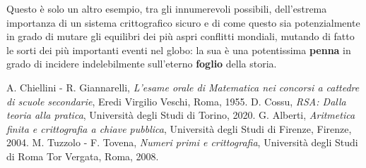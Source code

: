 \documentclass[a4paper,12pt]{article}
\begin{document}
Questo è solo un altro esempio, tra gli innumerevoli possibili, dell'estrema importanza di un sistema crittografico sicuro e di come questo sia potenzialmente in grado di mutare gli equilibri dei più aspri conflitti mondiali, mutando di fatto le sorti dei più importanti eventi nel globo: la sua è una potentissima \textbf{penna} in grado di incidere indelebilmente sull'eterno \textbf{foglio} della storia.
\begin{thebibliography}{99}
 A. Chiellini - R. Giannarelli, \emph{L'esame orale di Matematica nei concorsi a cattedre di scuole secondarie}, Eredi Virgilio Veschi, Roma, 1955.
 D. Cossu, \emph{RSA: Dalla teoria alla pratica}, Università degli Studi di Torino, 2020.
 G. Alberti, \emph{Aritmetica finita e crittografia a chiave pubblica}, Università degli Studi di Firenze, Firenze, 2004.
 M. Tuzzolo - F. Tovena, \emph{Numeri primi e crittografia}, Università degli Studi di Roma Tor Vergata, Roma, 2008.
\end{thebibliography}
\end{document}
